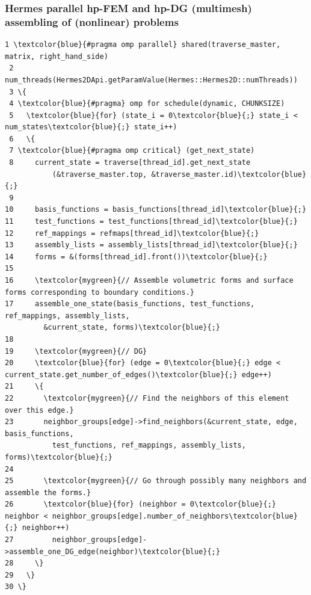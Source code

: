 \documentclass{beamer}
\begin{document}
\def\Tiny{\fontsize{6pt}{0pt}\selectfont}
\def\Tinya{\fontsize{8pt}{0pt}\selectfont}
\def\Tinyb{\fontsize{7pt}{0pt}\selectfont}
\begin{frame}[fragile]
\frametitle{Hermes parallel hp-FEM and hp-DG (multimesh) assembling of (nonlinear) problems}
\begin{Verbatim}[commandchars=\\\{\}, fontsize=\Tiny]
 1 \textcolor{blue}{#pragma omp parallel} shared(traverse_master, matrix, right_hand_side)
 2 num_threads(Hermes2DApi.getParamValue(Hermes::Hermes2D::numThreads))
 3 \{
 4 \textcolor{blue}{#pragma} omp for schedule(dynamic, CHUNKSIZE)
 5   \textcolor{blue}{for} (state_i = 0\textcolor{blue}{;} state_i < num_states\textcolor{blue}{;} state_i++)
 6   \{
 7 \textcolor{blue}{#pragma omp critical} (get_next_state)
 8     current_state = traverse[thread_id].get_next_state
           (&traverse_master.top, &traverse_master.id)\textcolor{blue}{;}
 9
10     basis_functions = basis_functions[thread_id]\textcolor{blue}{;}
11     test_functions = test_functions[thread_id]\textcolor{blue}{;}
12     ref_mappings = refmaps[thread_id]\textcolor{blue}{;}
13     assembly_lists = assembly_lists[thread_id]\textcolor{blue}{;}
14     forms = &(forms[thread_id].front())\textcolor{blue}{;}
15 
16     \textcolor{mygreen}{// Assemble volumetric forms and surface forms corresponding to boundary conditions.}
17     assemble_one_state(basis_functions, test_functions, ref_mappings, assembly_lists,
         &current_state, forms)\textcolor{blue}{;}
18 
19     \textcolor{mygreen}{// DG}
20     \textcolor{blue}{for} (edge = 0\textcolor{blue}{;} edge < current_state.get_number_of_edges()\textcolor{blue}{;} edge++)
21     \{
22       \textcolor{mygreen}{// Find the neighbors of this element over this edge.}
23       neighbor_groups[edge]->find_neighbors(&current_state, edge, basis_functions, 
           test_functions, ref_mappings, assembly_lists, forms)\textcolor{blue}{;}
24       
25       \textcolor{mygreen}{// Go through possibly many neighbors and assemble the forms.}
26       \textcolor{blue}{for} (neighbor = 0\textcolor{blue}{;} neighbor < neighbor_groups[edge].number_of_neighbors\textcolor{blue}{;} neighbor++)
27         neighbor_groups[edge]->assemble_one_DG_edge(neighbor)\textcolor{blue}{;}
28     \}
29   \}
30 \}
\end{Verbatim}
\end{frame}
\end{document}
